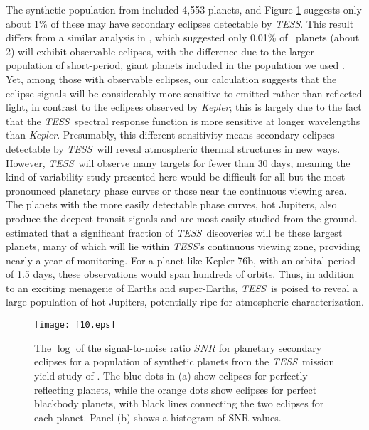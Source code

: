 \documentclass[manuscript]{aastex62}
\newcommand{\kepler}{{\it Kepler}}
\newcommand{\tess}{{\it TESS}}
\begin{document}
The synthetic population from \citet{2018ApJS..239....2B} included 4,553 planets, and Figure \ref{fig:eclipse_estimates} suggests only about 1\% of these may have secondary eclipses detectable by \tess. This result differs from a similar analysis in \citet{2015ApJ...809...77S}, which suggested only 0.01\% of \TESS\ planets (about 2) will exhibit observable eclipses, with the difference due to the larger population of short-period, giant planets included in the population we used \citep{2018ApJS..239....2B}. Yet, among those with observable eclipses, our calculation suggests that the eclipse signals will be considerably more sensitive to emitted rather than reflected light, in contrast to the eclipses observed by \kepler; this is largely due to the fact that the \tess\ spectral response function is more sensitive at longer wavelengths than \kepler. Presumably, this different sensitivity means secondary eclipses detectable by \tess\ will reveal atmospheric thermal structures in new ways. However, \tess\ will observe many targets for fewer than 30 days, meaning the kind of variability study presented here would be difficult for all but the most pronounced planetary phase curves or those near the continuous viewing area. The planets with the more easily detectable phase curves, hot Jupiters, also produce the deepest transit signals and are most easily studied from the ground. \citet{2018ApJS..239....2B} estimated that a significant fraction of \tess\ discoveries will be these largest planets, many of which will lie within \tess's continuous viewing zone, providing nearly a year of monitoring. For a planet like Kepler-76b, with an orbital period of 1.5 days, these observations would span hundreds of orbits. Thus, in addition to an exciting menagerie of Earths and super-Earths, \tess\ is poised to reveal a large population of hot Jupiters, potentially ripe for atmospheric characterization. 

\begin{figure}
\texttt{[image: f10.eps]}
\caption{The $\log$ of the signal-to-noise ratio $SNR$ for planetary secondary eclipses for a population of synthetic planets from the \tess\ mission yield study of \citet{2018ApJS..239....2B}. The blue dots in (a) show eclipses for perfectly reflecting planets, while the orange dots show eclipses for perfect blackbody planets, with black lines connecting the two eclipses for each planet. Panel (b) shows a histogram of SNR-values. \label{fig:eclipse_estimates}}
\end{figure}
\end{document}
